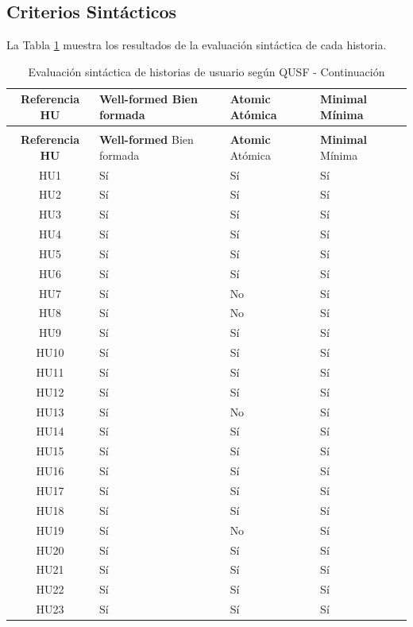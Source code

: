 \subsection{Criterios Sintácticos}

La Tabla \ref{table:sin} muestra los resultados de la evaluación sintáctica de cada historia.

\begin{longtable}{|c|p{2.5cm}|p{2cm}|p{2cm}|}
\caption{Evaluación sintáctica de historias de usuario según QUSF}
\label{table:sin} \\
\hline
\textbf{Referencia HU}
& \textbf{Well-formed} \newline Bien formada
& \textbf{Atomic} \newline Atómica
& \textbf{Minimal} \newline Mínima \\ \hline
\endfirsthead

\caption{Evaluación sintáctica de historias de usuario según QUSF - Continuación} \\
\hline
\textbf{Referencia HU}
& \textbf{Well-formed} \newline Bien formada
& \textbf{Atomic} \newline Atómica
& \textbf{Minimal} \newline Mínima \\ \hline
\endhead

  HU1  & Sí & Sí & Sí \\ \hline
  HU2  & Sí & Sí & Sí \\ \hline
  HU3  & Sí & Sí & Sí \\ \hline
  HU4  & Sí & Sí & Sí \\ \hline
  HU5  & Sí & Sí & Sí \\ \hline
  HU6  & Sí & Sí & Sí \\ \hline
  HU7  & Sí & No & Sí \\ \hline
  HU8  & Sí & No & Sí \\ \hline
  HU9  & Sí & Sí & Sí \\ \hline
  HU10 & Sí & Sí & Sí \\ \hline
  HU11 & Sí & Sí & Sí \\ \hline
  HU12 & Sí & Sí & Sí \\ \hline
  HU13 & Sí & No & Sí \\ \hline
  HU14 & Sí & Sí & Sí \\ \hline
  HU15 & Sí & Sí & Sí \\ \hline
  HU16 & Sí & Sí & Sí \\ \hline
  HU17 & Sí & Sí & Sí \\ \hline
  HU18 & Sí & Sí & Sí \\ \hline
  HU19 & Sí & No & Sí \\ \hline
  HU20 & Sí & Sí & Sí \\ \hline
  HU21 & Sí & Sí & Sí \\ \hline
  HU22 & Sí & Sí & Sí \\ \hline
  HU23 & Sí & Sí & Sí \\ \hline
\end{longtable}


